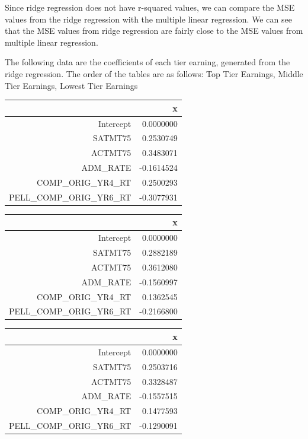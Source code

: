\documentclass{article}
\begin{document}
  Since ridge regression does not have r-squared values, we can compare the MSE values from the ridge regression with the multiple linear regression.  We can see that the MSE values from ridge regression are fairly close to the MSE values from multiple linear regression. 

  The following data are the coefficients of each tier earning, generated from the ridge regression.  The order of the tables are as follows: Top Tier Earnings, Middle Tier Earnings, Lowest Tier Earnings \newline
\begin{table}[ht]
\centering
\begin{tabular}{rr}
  \hline
 & x \\ 
  \hline
Intercept & 0.0000000 \\ 
  SATMT75 & 0.2530749 \\ 
  ACTMT75 & 0.3483071 \\ 
  ADM\_RATE & -0.1614524 \\ 
  COMP\_ORIG\_YR4\_RT & 0.2500293 \\ 
  PELL\_COMP\_ORIG\_YR6\_RT & -0.3077931 \\ 
   \hline
\end{tabular}
\end{table}%
\begin{table}[ht]
\centering
\begin{tabular}{rr}
  \hline
 & x \\ 
  \hline
Intercept & 0.0000000 \\ 
  SATMT75 & 0.2882189 \\ 
  ACTMT75 & 0.3612080 \\ 
  ADM\_RATE & -0.1560997 \\ 
  COMP\_ORIG\_YR4\_RT & 0.1362545 \\ 
  PELL\_COMP\_ORIG\_YR6\_RT & -0.2166800 \\ 
   \hline
\end{tabular}
\end{table}%
\begin{table}[ht]
\centering
\begin{tabular}{rr}
  \hline
 & x \\ 
  \hline
Intercept & 0.0000000 \\ 
  SATMT75 & 0.2503716 \\ 
  ACTMT75 & 0.3328487 \\ 
  ADM\_RATE & -0.1557515 \\ 
  COMP\_ORIG\_YR4\_RT & 0.1477593 \\ 
  PELL\_COMP\_ORIG\_YR6\_RT & -0.1290091 \\ 
   \hline
\end{tabular}
\end{table}\newline
\end{document}
